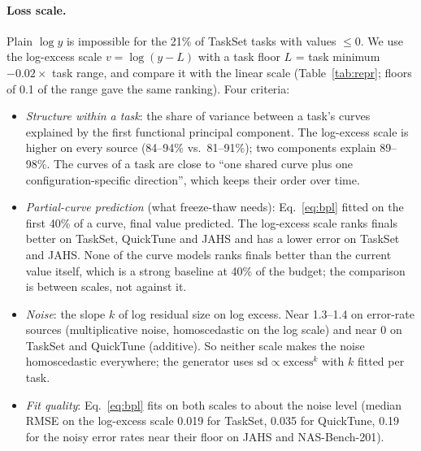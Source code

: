 \documentclass[10pt]{article}
\begin{document}
\paragraph{Loss scale.} Plain $\log y$ is impossible for the 21\% of TaskSet tasks with values $\le 0$. We use the
log-excess scale $v = \log(y - L)$ with a task floor $L$ = task minimum $- 0.02 \times$ task range, and compare it
with the linear scale (Table~\ref{tab:repr}; floors of 0.1 of the range gave the same ranking). Four criteria:
\begin{itemize}
  \item \emph{Structure within a task}: the share of variance between a task's curves explained by the first
    functional principal component. The log-excess scale is higher on every source (84--94\% vs.\ 81--91\%);
    two components explain 89--98\%. The curves of a task are close to ``one shared curve plus one
    configuration-specific direction'', which keeps their order over time.
  \item \emph{Partial-curve prediction} (what freeze-thaw needs): Eq.~\eqref{eq:bpl} fitted on the first 40\% of a
    curve, final value predicted. The log-excess scale ranks finals better on TaskSet, QuickTune and JAHS and has a
    lower error on TaskSet and JAHS. None of the curve models ranks finals better than the current value itself,
    which is a strong baseline at 40\% of the budget; the comparison is between scales, not against it.
  \item \emph{Noise}: the slope $k$ of log residual size on log excess. Near 1.3--1.4 on error-rate sources
    (multiplicative noise, homoscedastic on the log scale) and near 0 on TaskSet and QuickTune (additive). So
    neither scale makes the noise homoscedastic everywhere; the generator uses $\text{sd} \propto
    \text{excess}^{k}$ with $k$ fitted per task.
  \item \emph{Fit quality}: Eq.~\eqref{eq:bpl} fits on both scales to about the noise level (median RMSE on the
    log-excess scale 0.019 for TaskSet, 0.035 for QuickTune, 0.19 for the noisy error rates near their floor on
    JAHS and NAS-Bench-201).
\end{itemize}

\begin{table}[t]
\centering\small
\caption{Loss scale, compared on fit tasks (medians over tasks; bold: the better scale). Predictions use the first
40\% of each curve. ``Current value'': ranking finals by the value at 40\%, for scale. Error of finals: median
absolute error as a share of the task range. Noise slope $k$: residual sd $\propto$ excess$^k$. NAS-Bench-201 has
only 3 fit tasks.}
\label{tab:repr}
\resizebox{\linewidth}{!}{}
\end{table}
\end{document}
